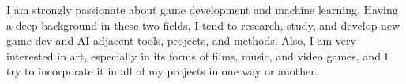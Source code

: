 

\begin{cvparagraph}

\vspace{2pt}
I am strongly passionate about game development and machine learning. Having a deep background in these two fields, I tend to research, study, and develop new game-dev and AI adjacent tools, projects, and methods. Also, I am very interested in art, especially in its forms of films, music, and video games, and I try to incorporate it in all of my projects in one way or another.
\end{cvparagraph}
